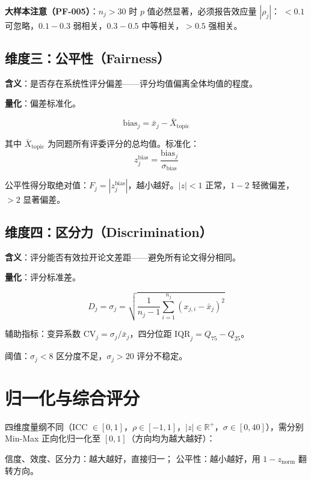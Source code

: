 \documentclass[UTF8]{ctexart}
\begin{document}
\textbf{大样本注意（PF-005）}：$n_j > 30$ 时 $p$ 值必然显著，必须报告效应量 $|\rho_j|$：
$<0.1$ 可忽略，$0.1-0.3$ 弱相关，$0.3-0.5$ 中等相关，$>0.5$ 强相关。

\subsection{维度三：公平性（Fairness）}

\textbf{含义}：是否存在系统性评分偏差——评分均值偏离全体均值的程度。

\textbf{量化}：偏差标准化。

\begin{equation}
\text{bias}_j = \bar{x}_j - \bar{X}_{\text{topic}}
\end{equation}

其中 $\bar{X}_{\text{topic}}$ 为同题所有评委评分的总均值。标准化：
\begin{equation}
z_j^{\text{bias}} = \frac{\text{bias}_j}{\sigma_{\text{bias}}}
\end{equation}

公平性得分取绝对值：$F_j = |z_j^{\text{bias}}|$，越小越好。$|z| < 1$ 正常，$1-2$ 轻微偏差，$>2$ 显著偏差。

\subsection{维度四：区分力（Discrimination）}

\textbf{含义}：评分能否有效拉开论文差距——避免所有论文得分相同。

\textbf{量化}：评分标准差。

\begin{equation}
D_j = \sigma_j = \sqrt{\frac{1}{n_j - 1} \sum_{i=1}^{n_j} (x_{j,i} - \bar{x}_j)^2}
\end{equation}

辅助指标：变异系数 $\text{CV}_j = \sigma_j / \bar{x}_j$，四分位距 $\text{IQR}_j = Q_{75} - Q_{25}$。

阈值：$\sigma_j < 8$ 区分度不足，$\sigma_j > 20$ 评分不稳定。

\section{归一化与综合评分}

四维度量纲不同（ICC $\in [0,1]$，$\rho \in [-1,1]$，$|z| \in \mathbb{R}^+$，$\sigma \in [0, 40]$），需分别 Min-Max 正向化归一化至 $[0, 1]$（方向均为越大越好）：

信度、效度、区分力：越大越好，直接归一；
公平性：越小越好，用 $1 - z_{\text{norm}}$ 翻转方向。
\end{document}
